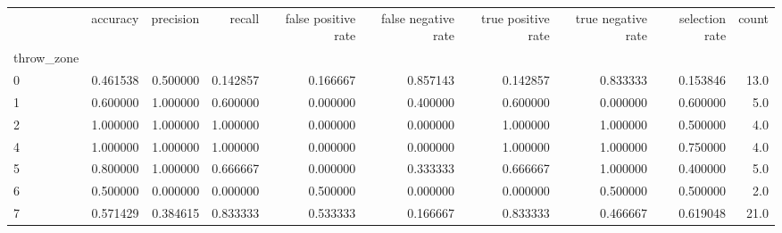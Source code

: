 \begin{tabular}{lrrrrrrrrr}
\toprule
{} &  accuracy &  precision &    recall &  false positive rate &  false negative rate &  true positive rate &  true negative rate &  selection rate &  count \\
throw\_zone &           &            &           &                      &                      &                     &                     &                 &        \\
\midrule
0          &  0.461538 &   0.500000 &  0.142857 &             0.166667 &             0.857143 &            0.142857 &            0.833333 &        0.153846 &   13.0 \\
1          &  0.600000 &   1.000000 &  0.600000 &             0.000000 &             0.400000 &            0.600000 &            0.000000 &        0.600000 &    5.0 \\
2          &  1.000000 &   1.000000 &  1.000000 &             0.000000 &             0.000000 &            1.000000 &            1.000000 &        0.500000 &    4.0 \\
4          &  1.000000 &   1.000000 &  1.000000 &             0.000000 &             0.000000 &            1.000000 &            1.000000 &        0.750000 &    4.0 \\
5          &  0.800000 &   1.000000 &  0.666667 &             0.000000 &             0.333333 &            0.666667 &            1.000000 &        0.400000 &    5.0 \\
6          &  0.500000 &   0.000000 &  0.000000 &             0.500000 &             0.000000 &            0.000000 &            0.500000 &        0.500000 &    2.0 \\
7          &  0.571429 &   0.384615 &  0.833333 &             0.533333 &             0.166667 &            0.833333 &            0.466667 &        0.619048 &   21.0 \\
\bottomrule
\end{tabular}
